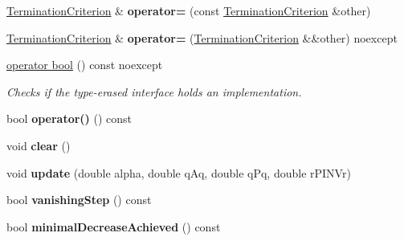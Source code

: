 \begin{DoxyCompactItemize}
\item 
\hypertarget{classSpacy_1_1CG_1_1TerminationCriterion_a5f1b681ad585c508dd3a71b4f24eea6d}{\hyperlink{classSpacy_1_1CG_1_1TerminationCriterion}{\-Termination\-Criterion} \& {\bfseries operator=} (const \hyperlink{classSpacy_1_1CG_1_1TerminationCriterion}{\-Termination\-Criterion} \&other)}\label{classSpacy_1_1CG_1_1TerminationCriterion_a5f1b681ad585c508dd3a71b4f24eea6d}

\item 
\hypertarget{classSpacy_1_1CG_1_1TerminationCriterion_ad39a2f9dfcdd4f870d10619f36cafe74}{\hyperlink{classSpacy_1_1CG_1_1TerminationCriterion}{\-Termination\-Criterion} \& {\bfseries operator=} (\hyperlink{classSpacy_1_1CG_1_1TerminationCriterion}{\-Termination\-Criterion} \&\&other) noexcept}\label{classSpacy_1_1CG_1_1TerminationCriterion_ad39a2f9dfcdd4f870d10619f36cafe74}

\item 
\hyperlink{classSpacy_1_1CG_1_1TerminationCriterion_a527774f74e16fe94efa958e594c1be6d}{operator bool} () const noexcept
\begin{DoxyCompactList}\small\item\em \-Checks if the type-\/erased interface holds an implementation. \end{DoxyCompactList}\item 
\hypertarget{classSpacy_1_1CG_1_1TerminationCriterion_ab109eb287dd3622db54bbbdf0a55660a}{bool {\bfseries operator()} () const }\label{classSpacy_1_1CG_1_1TerminationCriterion_ab109eb287dd3622db54bbbdf0a55660a}

\item 
\hypertarget{classSpacy_1_1CG_1_1TerminationCriterion_a347651c14a38ce3bf1c92454aded97ab}{void {\bfseries clear} ()}\label{classSpacy_1_1CG_1_1TerminationCriterion_a347651c14a38ce3bf1c92454aded97ab}

\item 
\hypertarget{classSpacy_1_1CG_1_1TerminationCriterion_a4ef7ad43f594bab9b21f60e36697c516}{void {\bfseries update} (double alpha, double q\-Aq, double q\-Pq, double r\-P\-I\-N\-Vr)}\label{classSpacy_1_1CG_1_1TerminationCriterion_a4ef7ad43f594bab9b21f60e36697c516}

\item 
\hypertarget{classSpacy_1_1CG_1_1TerminationCriterion_ab92b8e27edb8290ed34c34a242f900d3}{bool {\bfseries vanishing\-Step} () const }\label{classSpacy_1_1CG_1_1TerminationCriterion_ab92b8e27edb8290ed34c34a242f900d3}

\item 
\hypertarget{classSpacy_1_1CG_1_1TerminationCriterion_a928da2a9183b773ca90477057b3d2b8b}{bool {\bfseries minimal\-Decrease\-Achieved} () const }\label{classSpacy_1_1CG_1_1TerminationCriterion_a928da2a9183b773ca90477057b3d2b8b}


\end{DoxyCompactItemize}
